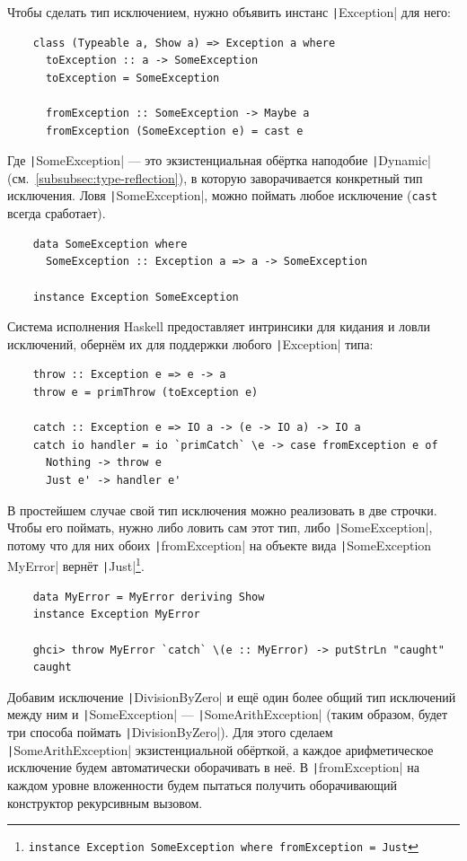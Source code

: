 Чтобы сделать тип исключением, нужно объявить инстанс \texttt|Exception| для него:
\begin{verbatim}
    class (Typeable a, Show a) => Exception a where
      toException :: a -> SomeException
      toException = SomeException

      fromException :: SomeException -> Maybe a
      fromException (SomeException e) = cast e
\end{verbatim}
Где \texttt|SomeException| --- это экзистенциальная обёртка наподобие \texttt|Dynamic| (см.\ \ref{subsubsec:type-reflection}), в которую заворачивается конкретный тип исключения.
Ловя \texttt|SomeException|, можно поймать любое исключение (\texttt{cast} всегда сработает).
\begin{verbatim}
    data SomeException where
      SomeException :: Exception a => a -> SomeException

    instance Exception SomeException
\end{verbatim}

Система исполнения Haskell предоставляет интринсики для кидания и ловли исключений, обернём их для поддержки любого \texttt|Exception| типа:
\begin{verbatim}
    throw :: Exception e => e -> a
    throw e = primThrow (toException e)

    catch :: Exception e => IO a -> (e -> IO a) -> IO a
    catch io handler = io `primCatch` \e -> case fromException e of
      Nothing -> throw e
      Just e' -> handler e'
\end{verbatim}

В простейшем случае свой тип исключения можно реализовать в две строчки.
Чтобы его поймать, нужно либо ловить сам этот тип, либо \texttt|SomeException|, потому что для них обоих \texttt|fromException| на объекте вида \texttt|SomeException MyError| вернёт \texttt|Just|\footnote{\texttt{instance Exception SomeException where fromException = Just}}.
\begin{verbatim}
    data MyError = MyError deriving Show
    instance Exception MyError

    ghci> throw MyError `catch` \(e :: MyError) -> putStrLn "caught"
    caught
\end{verbatim}

Добавим исключение \texttt|DivisionByZero| и ещё один более общий тип исключений между ним и \texttt|SomeException| --- \texttt|SomeArithException| (таким образом, будет три способа поймать \texttt|DivisionByZero|).
Для этого сделаем \texttt|SomeArithException| экзистенциальной обёрткой, а каждое арифметическое исключение будем автоматически оборачивать в неё.
В \texttt|fromException| на каждом уровне вложенности будем пытаться получить оборачивающий конструктор рекурсивным вызовом.

